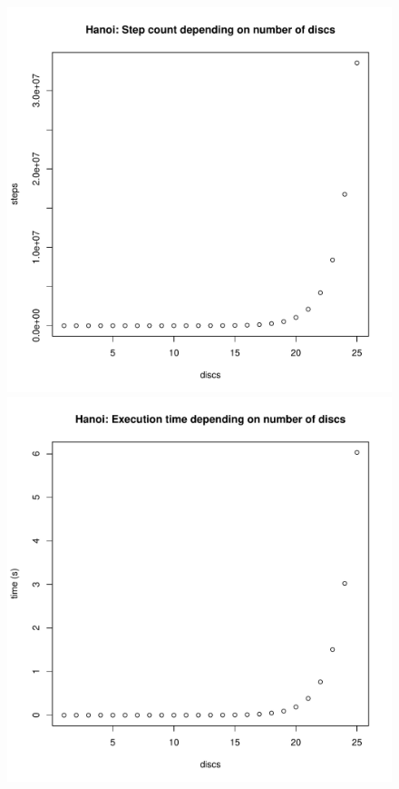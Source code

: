 \documentclass[a4paper, 11pt]{article}%
\begin{document}
		\begin{figure}[!h]
			  \includegraphics[width=\linewidth]{steps_plot.pdf}
			\endminipage\hfill
			  \includegraphics[width=\linewidth]{time_plot.pdf}
			\endminipage\hfill
		\end{figure}
			
\end{document}
